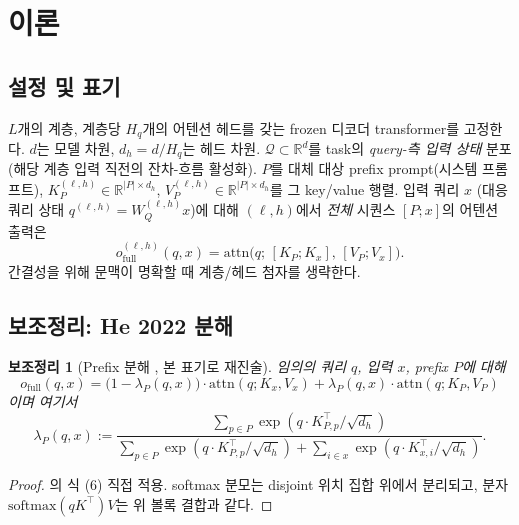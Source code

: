 \documentclass[11pt]{article}
\newtheorem{lemma}{보조정리}
\theoremstyle{definition}
\newcommand{\R}{\mathbb{R}}
\newcommand{\dh}{d_h}
\newcommand{\Hq}{H_q}
\newcommand{\softmax}{\mathrm{softmax}}
\newcommand{\attn}{\mathrm{attn}}
\begin{document}
\section{이론}
\label{sec:theory}

\subsection{설정 및 표기}
\label{sec:notation}

$L$개의 계층, 계층당 $\Hq$개의 어텐션 헤드를 갖는 frozen 디코더 transformer를 고정한다. $d$는 모델 차원, $\dh = d/\Hq$는 헤드 차원. $\mathcal{Q} \subset \R^d$를 task의 \emph{query-측 입력 상태} 분포 (해당 계층 입력 직전의 잔차-흐름 활성화). $P$를 대체 대상 prefix prompt(시스템 프롬프트), $K_P^{(\ell,h)} \in \R^{|P|\times \dh}$, $V_P^{(\ell,h)} \in \R^{|P|\times \dh}$를 그 key/value 행렬. 입력 쿼리 $x$ (대응 쿼리 상태 $q^{(\ell,h)} = W_Q^{(\ell,h)} x$)에 대해 $(\ell, h)$에서 \emph{전체} 시퀀스 $[P; x]$의 어텐션 출력은
\begin{equation}
o_{\mathrm{full}}^{(\ell,h)}(q,x) = \attn\bigl(q;\, [K_P; K_x],\, [V_P; V_x]\bigr).
\end{equation}
간결성을 위해 문맥이 명확할 때 계층/헤드 첨자를 생략한다.

\subsection{보조정리: He 2022 분해}
\label{sec:lemma-he}

\begin{lemma}[Prefix 분해 \citep{he2022unified}, 본 표기로 재진술]
\label{lem:he}
임의의 쿼리 $q$, 입력 $x$, prefix $P$에 대해
\begin{equation}
o_{\mathrm{full}}(q,x) = \bigl(1-\lambda_P(q,x)\bigr)\cdot \attn(q; K_x, V_x) + \lambda_P(q,x)\cdot \attn(q; K_P, V_P)
\label{eq:he-decomp}
\end{equation}
이며 여기서
\begin{equation}
\lambda_P(q,x) := \frac{\sum_{p\in P} \exp(q \cdot K_{P,p}^\top / \sqrt{\dh})}{\sum_{p\in P}\exp(q\cdot K_{P,p}^\top/\sqrt{\dh}) + \sum_{i\in x}\exp(q\cdot K_{x,i}^\top/\sqrt{\dh})}.
\end{equation}
\end{lemma}

\begin{proof}
\citet{he2022unified}의 식 (6) 직접 적용. softmax 분모는 disjoint 위치 집합 위에서 분리되고, 분자 $\softmax(qK^\top)V$는 위 볼록 결합과 같다.
\end{proof}
\end{document}
